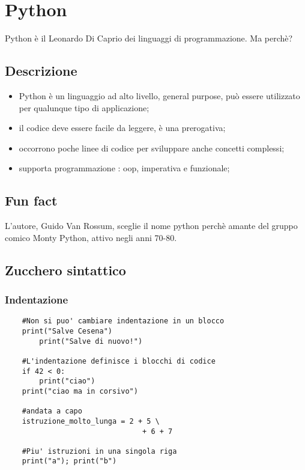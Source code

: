 \chapter{Python}

Python è il Leonardo Di Caprio dei linguaggi di programmazione. Ma perchè?

\section{Descrizione}

\begin{itemize}
	\item Python è un linguaggio ad alto livello, general purpose, può essere utilizzato per qualunque tipo di applicazione;
	\item il codice deve essere facile da leggere, è una prerogativa;
	\item occorrono poche linee di codice per sviluppare anche concetti complessi;
	\item supporta programmazione : oop, imperativa e funzionale;
\end{itemize}

\section{Fun fact}

L'autore, Guido Van Rossum, sceglie il nome python perchè amante del gruppo comico Monty Python, attivo negli anni 70-80. 

\section{Zucchero sintattico}

\subsection{Indentazione}

\begin{lstlisting}
	#Non si puo' cambiare indentazione in un blocco
	print("Salve Cesena")
		print("Salve di nuovo!")
	
	#L'indentazione definisce i blocchi di codice
	if 42 < 0:
		print("ciao")
	print("ciao ma in corsivo")
	
	#andata a capo
	istruzione_molto_lunga = 2 + 5 \
								+ 6 + 7

	#Piu' istruzioni in una singola riga
	print("a"); print("b")
\end{lstlisting}

